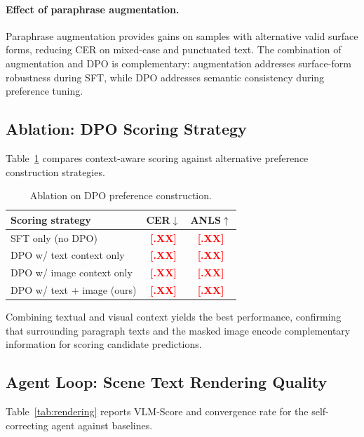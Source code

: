 \documentclass[uplatex,10pt,twocolumn,a4paper]{article}
\newcommand{\TODO}[1]{\textcolor{red}{\textbf{[#1]}}}
\begin{document}
\paragraph{Effect of paraphrase augmentation.}
Paraphrase augmentation provides gains on samples with alternative
valid surface forms, reducing CER on mixed-case and punctuated text.
The combination of augmentation and DPO is complementary: augmentation
addresses surface-form robustness during SFT, while DPO addresses
semantic consistency during preference tuning.

\subsection{Ablation: DPO Scoring Strategy}

Table~\ref{tab:ablation_dpo} compares context-aware scoring against
alternative preference construction strategies.

\begin{table}[t]
  \centering
  \caption{Ablation on DPO preference construction.}
  \label{tab:ablation_dpo}
  \small
  \begin{tabular}{lcc}
    \toprule
    Scoring strategy & CER$\downarrow$ & ANLS$\uparrow$ \\
    \midrule
    SFT only (no DPO)            & \TODO{.XX} & \TODO{.XX} \\
    DPO w/ text context only     & \TODO{.XX} & \TODO{.XX} \\
    DPO w/ image context only    & \TODO{.XX} & \TODO{.XX} \\
    DPO w/ text + image (ours)   & \TODO{.XX} & \TODO{.XX} \\
    \bottomrule
  \end{tabular}
\end{table}

Combining textual and visual context yields the best performance,
confirming that surrounding paragraph texts and the masked image
encode complementary information for scoring candidate predictions.

\subsection{Agent Loop: Scene Text Rendering Quality}

Table~\ref{tab:rendering} reports VLM-Score and convergence rate for
the self-correcting agent against baselines.
\end{document}
